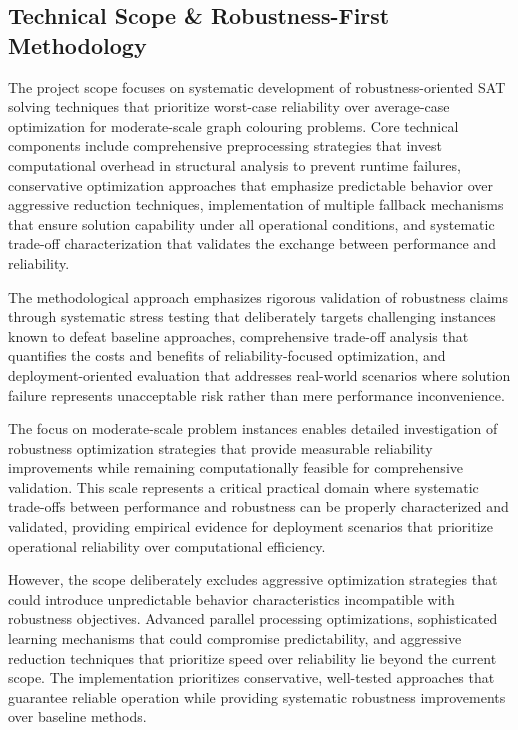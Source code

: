 \subsection{Technical Scope \& Robustness-First Methodology}

The project scope focuses on systematic development of robustness-oriented SAT solving techniques that prioritize worst-case reliability over average-case optimization for moderate-scale graph colouring problems. Core technical components include comprehensive preprocessing strategies that invest computational overhead in structural analysis to prevent runtime failures, conservative optimization approaches that emphasize predictable behavior over aggressive reduction techniques, implementation of multiple fallback mechanisms that ensure solution capability under all operational conditions, and systematic trade-off characterization that validates the exchange between performance and reliability.

The methodological approach emphasizes rigorous validation of robustness claims through systematic stress testing that deliberately targets challenging instances known to defeat baseline approaches, comprehensive trade-off analysis that quantifies the costs and benefits of reliability-focused optimization, and deployment-oriented evaluation that addresses real-world scenarios where solution failure represents unacceptable risk rather than mere performance inconvenience.

The focus on moderate-scale problem instances enables detailed investigation of robustness optimization strategies that provide measurable reliability improvements while remaining computationally feasible for comprehensive validation. This scale represents a critical practical domain where systematic trade-offs between performance and robustness can be properly characterized and validated, providing empirical evidence for deployment scenarios that prioritize operational reliability over computational efficiency.

However, the scope deliberately excludes aggressive optimization strategies that could introduce unpredictable behavior characteristics incompatible with robustness objectives. Advanced parallel processing optimizations, sophisticated learning mechanisms that could compromise predictability, and aggressive reduction techniques that prioritize speed over reliability lie beyond the current scope. The implementation prioritizes conservative, well-tested approaches that guarantee reliable operation while providing systematic robustness improvements over baseline methods.


